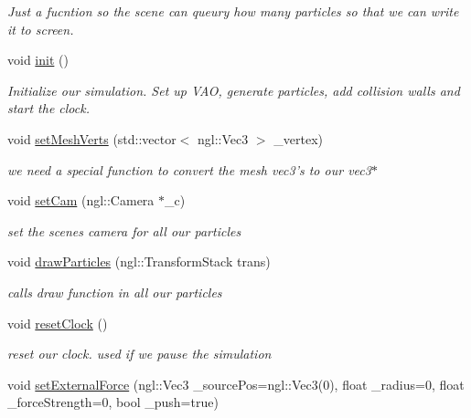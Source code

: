 \begin{DoxyCompactItemize}
\begin{DoxyCompactList}\small\item\em Just a fucntion so the scene can queury how many particles so that we can write it to screen. \end{DoxyCompactList}\item 
\hypertarget{classSPHMelt_a85546245558ea9821928e9b22470db52}{void \hyperlink{classSPHMelt_a85546245558ea9821928e9b22470db52}{init} ()}\label{classSPHMelt_a85546245558ea9821928e9b22470db52}

\begin{DoxyCompactList}\small\item\em Initialize our simulation. Set up V\-A\-O, generate particles, add collision walls and start the clock. \end{DoxyCompactList}\item 
void \hyperlink{classSPHMelt_ae1a307a3d8c33ebe599b74ab5bc2687c}{set\-Mesh\-Verts} (std\-::vector$<$ ngl\-::\-Vec3 $>$ \-\_\-vertex)
\begin{DoxyCompactList}\small\item\em we need a special function to convert the mesh vec3's to our vec3$\ast$ \end{DoxyCompactList}\item 
void \hyperlink{classSPHMelt_a47fbcb7522dbd8e647f818d094002d91}{set\-Cam} (ngl\-::\-Camera $\ast$\-\_\-c)
\begin{DoxyCompactList}\small\item\em set the scenes camera for all our particles \end{DoxyCompactList}\item 
void \hyperlink{classSPHMelt_a3293b79bb29229004db2b12d24f50778}{draw\-Particles} (ngl\-::\-Transform\-Stack trans)
\begin{DoxyCompactList}\small\item\em calls draw function in all our particles \end{DoxyCompactList}\item 
\hypertarget{classSPHMelt_a13d4145dbc7f7de93fd806a8971fe935}{void \hyperlink{classSPHMelt_a13d4145dbc7f7de93fd806a8971fe935}{reset\-Clock} ()}\label{classSPHMelt_a13d4145dbc7f7de93fd806a8971fe935}

\begin{DoxyCompactList}\small\item\em reset our clock. used if we pause the simulation \end{DoxyCompactList}\item 
\hypertarget{classSPHMelt_a2b67bc2d7444505213431381a1d96f55}{void \hyperlink{classSPHMelt_a2b67bc2d7444505213431381a1d96f55}{set\-External\-Force} (ngl\-::\-Vec3 \-\_\-source\-Pos=ngl\-::\-Vec3(0), float \-\_\-radius=0, float \-\_\-force\-Strength=0, bool \-\_\-push=true)}\label{classSPHMelt_a2b67bc2d7444505213431381a1d96f55}


\end{DoxyCompactItemize}
